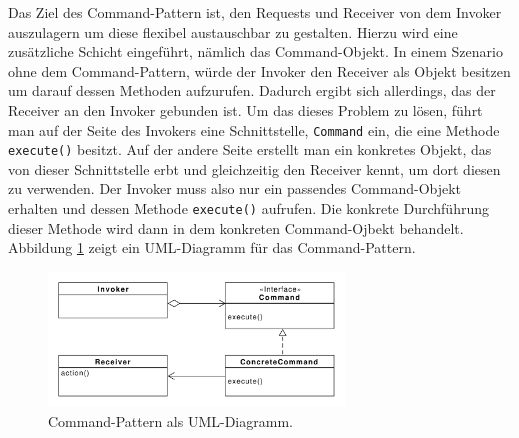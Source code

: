 Das Ziel des Command-Pattern ist, den Requests und Receiver von dem Invoker auszulagern um diese flexibel austauschbar zu gestalten. Hierzu wird eine zusätzliche Schicht eingeführt, nämlich das Command-Objekt. In einem  Szenario ohne dem Command-Pattern, würde der Invoker den Receiver als Objekt besitzen um darauf dessen Methoden aufzurufen. Dadurch ergibt sich allerdings, das der Receiver an den Invoker gebunden ist. Um das dieses Problem zu lösen, führt man auf der Seite des Invokers eine Schnittstelle, \texttt{Command} ein, die eine Methode \texttt{execute()} besitzt. Auf der andere Seite erstellt man ein konkretes Objekt, das von dieser Schnittstelle erbt und gleichzeitig den Receiver kennt, um dort diesen zu verwenden. Der Invoker muss also nur ein passendes Command-Objekt erhalten und  dessen Methode \texttt{execute()} aufrufen. Die konkrete Durchführung dieser Methode wird  dann in dem konkreten Command-Ojbekt behandelt. Abbildung \ref{commanddiagramm} zeigt ein UML-Diagramm für das Command-Pattern.


\begin{figure}[htbp]
\centering
\includegraphics[width=0.7\textwidth]{./paper/command/command}
\caption{Command-Pattern als UML-Diagramm.}
\label{commanddiagramm}
\end{figure} 